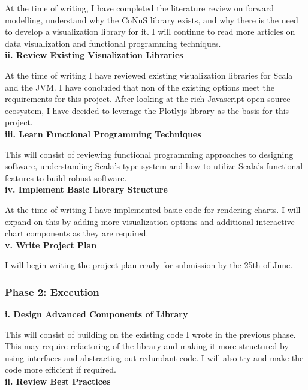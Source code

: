 \documentclass[12pt]{article}
\begin{document}
At the time of writing, I have completed the literature review on forward modelling, understand why the CoNuS library exists, and why there is the need to develop a visualization library for it. I will continue to read more articles on data visualization and functional programming techniques. \\

\textbf{ii. Review Existing Visualization Libraries}

At the time of writing I have reviewed existing visualization libraries for Scala and the JVM. I have concluded that non of the existing options meet the requirements for this project. After looking at the rich Javascript open-source ecosystem, I have decided to leverage the Plotlyjs library as the basis for this project. \\

\textbf{iii. Learn Functional Programming Techniques}

This will consist of reviewing functional programming approaches to designing software, understanding Scala's type system and how to utilize Scala's functional features to build robust software. \\

\textbf{iv. Implement Basic Library Structure}

At the time of writing I have implemented basic code for rendering charts. I will expand on this by adding more visualization options and additional interactive chart components as they are required. \\

\textbf{v. Write Project Plan}

I will begin writing the project plan ready for submission by the 25th of June. \\

\subsubsection{Phase 2: Execution}

\textbf{i. Design Advanced Components of Library}

This will consist of building on the existing code I wrote in the previous phase. This may require refactoring of the library and making it more structured by using interfaces and abstracting out redundant code. I will also try and make the code more efficient if required. \\

\textbf{ii. Review Best Practices}
\end{document}
